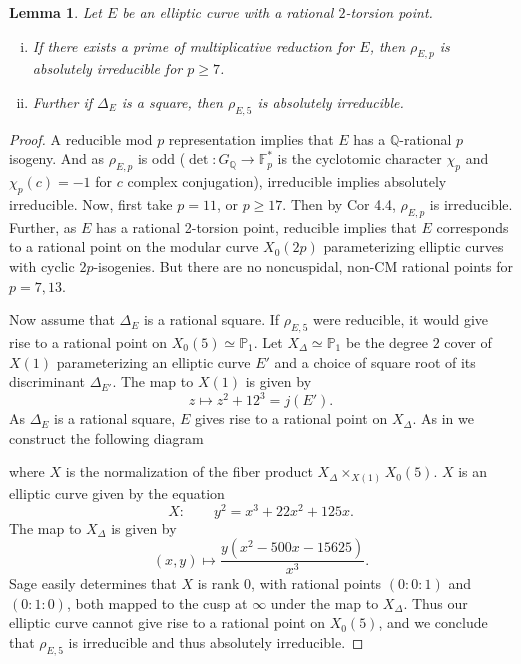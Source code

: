 \documentclass[12pt]{amsart}
\newtheorem{lem}[thm]{Lemma}
\theoremstyle{definition}
\def\F{{\mathbb F}}
\def\P{{{\mathbb P}}}
\def\Q{{\mathbb Q}}
\begin{document}
\begin{lem}\label{absirr}
Let $E$ be an elliptic curve with a rational $2$-torsion point.   
\begin{enumerate}[(i)]
\item If there exists a prime of multiplicative reduction for $E$, then $\rho_{E,p}$ is absolutely irreducible for $p \geq 7$.
\item Further if $\Delta_E$ is a square, then $\rho_{E,5}$ is absolutely irreducible.
\end{enumerate}
\end{lem}
\begin{proof}
A reducible mod $p$ representation implies that $E$ has a $\Q$-rational $p$ isogeny.  And as $\rho_{E,p}$ is odd ($\det \colon G_\Q \rightarrow \F_p^*$ is the cyclotomic character $\chi_p$ and $\chi_p(c)=-1$ for $c$ complex conjugation), irreducible implies absolutely irreducible.  
Now, first take $p =11$, or $p \geq 17$.  Then by \cite{mazur78} Cor 4.4, $\rho_{E,p}$ is irreducible.  Further, as $E$ has a rational 2-torsion point, reducible implies that $E$ corresponds to a rational point on the modular curve $X_0(2p)$ parameterizing elliptic curves with cyclic $2p$-isogenies.  But there are no noncuspidal, non-CM rational points for $p = 7,13$.

Now assume that $\Delta_E$ is a rational square.  If $\rho_{E,5}$ were reducible, it would give rise to a rational point on $X_0(5) \simeq \P_1$.  Let $X_{\Delta} \simeq \P_1$ be the degree $2$ cover of $X(1)$ parameterizing an elliptic curve $E'$ and a choice of square root of its discriminant $\Delta_{E'}$.  The map to $X(1)$ is given by
\[z \mapsto z^2 + 12^3 = j(E'). \]
As $\Delta_E$ is a rational square, $E$ gives rise to a rational point on $X_{\Delta}$.
As in \cite{brown12} we construct the following diagram
\begin{center}
\end{center}
where $X$ is the normalization of the fiber product $X_{\Delta} \times_{X(1)} X_0(5)$.  $X$ is an elliptic curve given by the equation
\[X \colon \qquad  y^2 = x^3 + 22x^2 +125x .\]
The map to $X_{\Delta}$ is given by
\[ (x,y) \mapsto \frac{y(x^2-500x -15625)}{x^3}. \]
Sage easily determines that $X$ is rank $0$, with rational points $(0:0:1)$ and $(0:1:0)$, both mapped to the cusp at $\infty$ under the map to $X_{\Delta}$. Thus our elliptic curve cannot give rise to a rational point on $X_0(5)$, and we conclude that $\rho_{E,5}$ is irreducible and thus absolutely irreducible. 
\end{proof}
\end{document}
